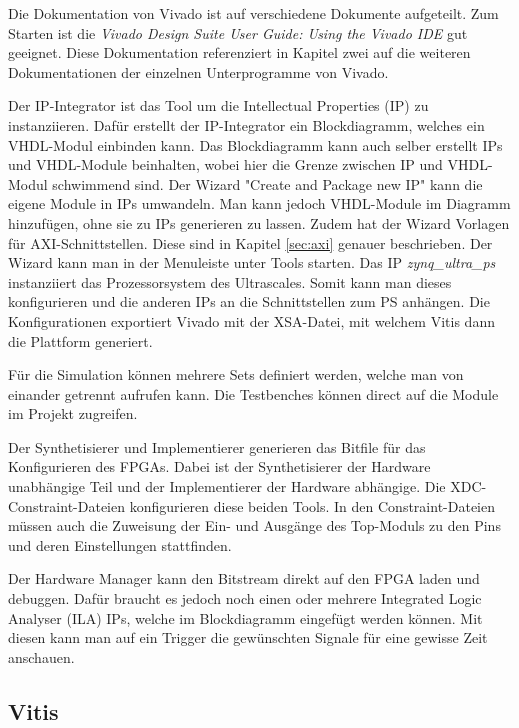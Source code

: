 Die Dokumentation von Vivado ist auf verschiedene Dokumente aufgeteilt. Zum Starten ist die \textit{Vivado Design Suite User Guide: Using the Vivado IDE} gut geeignet. Diese Dokumentation referenziert in Kapitel zwei auf die weiteren Dokumentationen der einzelnen Unterprogramme von Vivado. \cite{vivado}

Der IP-Integrator ist das Tool um die Intellectual Properties (IP) zu instanziieren. Dafür erstellt der IP-Integrator ein Blockdiagramm, welches ein VHDL-Modul einbinden kann. Das Blockdiagramm kann auch selber erstellt IPs und VHDL-Module beinhalten, wobei hier die Grenze zwischen IP und VHDL-Modul schwimmend sind. Der Wizard "Create and Package new IP" kann die eigene Module in IPs umwandeln. Man kann jedoch VHDL-Module im Diagramm hinzufügen, ohne sie zu IPs generieren zu lassen. Zudem hat der Wizard Vorlagen für AXI-Schnittstellen. Diese sind in Kapitel \ref{sec:axi} genauer beschrieben. Der Wizard kann man in der Menuleiste unter Tools starten. Das IP \textit{zynq\_ultra\_ps} instanziiert das Prozessorsystem des Ultrascales. Somit kann man dieses konfigurieren und die anderen IPs an die Schnittstellen zum PS anhängen. Die Konfigurationen exportiert Vivado mit der XSA-Datei, mit welchem Vitis dann die Plattform generiert. \cite{vivado_ip}\cite{vivado_ip_integrator}

Für die Simulation können mehrere Sets definiert werden, welche man von einander getrennt aufrufen kann. Die Testbenches können direct auf die Module im Projekt zugreifen. \cite{vivado_sim}

Der Synthetisierer und Implementierer generieren das Bitfile für das Konfigurieren des FPGAs. Dabei ist der Synthetisierer der Hardware unabhängige Teil und der Implementierer der Hardware abhängige. Die XDC-Constraint-Dateien konfigurieren diese beiden Tools. In den Constraint-Dateien müssen auch die Zuweisung der Ein- und Ausgänge des Top-Moduls zu den Pins und deren Einstellungen stattfinden. \cite{vivado_const}\cite{vivado_synth}\cite{vivado_imp}

Der Hardware Manager kann den Bitstream direkt auf den FPGA laden und debuggen. Dafür braucht es jedoch noch einen oder mehrere Integrated Logic Analyser (ILA) IPs, welche im Blockdiagramm eingefügt werden können. Mit diesen kann man auf ein Trigger die gewünschten Signale für eine gewisse Zeit anschauen. \cite{vivado_debug}\cite{ila}

\subsection{Vitis}

